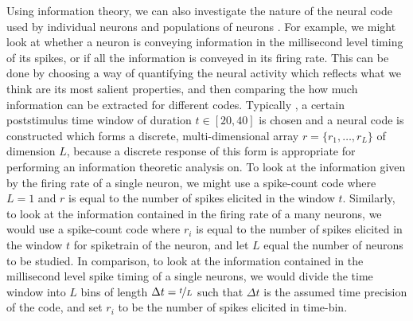 Using information theory, we can also investigate the nature of the neural code used by individual neurons and populations of neurons \cite{Optican1987}.
For example, we might look at whether a neuron is conveying information in the millisecond level timing of its spikes, or if all the information is conveyed in its firing rate.
This can be done by choosing a way of quantifying the neural activity which reflects what we think are its most salient properties, and then comparing the how much information can be extracted for different codes.
Typically \cite{Quiroga2009,Brasselet2012,Panzeri2007,Arabzadeh2006,Strong1998}, a certain poststimulus time window of duration $t \in [20,40]$ is chosen and a neural code is constructed which forms a discrete, multi-dimensional array $r = \{r_1, \ldots, r_L\}$ of dimension $L$, because a discrete response of this form is appropriate for performing an information theoretic analysis on.
To look at the information given by the firing rate of a single neuron, we might use a spike-count code where $L=1$ and $r$ is equal to the number of spikes elicited in the window $t$.
Similarly, to look at the information contained in the firing rate of a many neurons, we would use a spike-count code where $r_i$ is equal to the number of spikes elicited in the window $t$ for spiketrain of the  neuron, and let $L$ equal the number of neurons to be studied.
In comparison, to look at the information contained in the millisecond level spike timing of a single neurons, we would divide the time window into $L$ bins of length $\Delta t = \nicefrac{t}{L}$ such that $\Delta t$ is the assumed time precision of the code, and set $r_i$ to be the number of spikes elicited in  time-bin.

